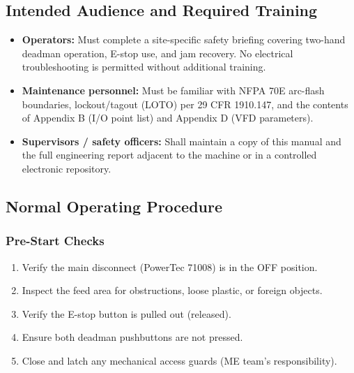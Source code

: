 \documentclass[hidelinks,12pt]{article}
\begin{document}
\subsection{Intended Audience and Required Training}
\begin{itemize}
    \item \textbf{Operators:} Must complete a site-specific safety briefing covering two-hand deadman operation, E-stop use, and jam recovery. No electrical troubleshooting is permitted without additional training.
    \item \textbf{Maintenance personnel:} Must be familiar with NFPA 70E arc-flash boundaries, lockout/tagout (LOTO) per 29 CFR 1910.147, and the contents of Appendix B (I/O point list) and Appendix D (VFD parameters).
    \item \textbf{Supervisors / safety officers:} Shall maintain a copy of this manual and the full engineering report adjacent to the machine or in a controlled electronic repository.
\end{itemize}

\subsection{Normal Operating Procedure}

\subsubsection{Pre-Start Checks}
\begin{enumerate}
    \item Verify the main disconnect (PowerTec 71008) is in the OFF position.
    \item Inspect the feed area for obstructions, loose plastic, or foreign objects.
    \item Verify the E-stop button is pulled out (released).
    \item Ensure both deadman pushbuttons are not pressed.
    \item Close and latch any mechanical access guards (ME team's responsibility).
\end{enumerate}
\end{document}
